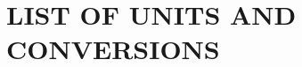 \documentclass[main]{subfiles}
\begin{document}
\section*{\centering \Large{\MakeUppercase{List of Units and Conversions}}}
\end{document}

